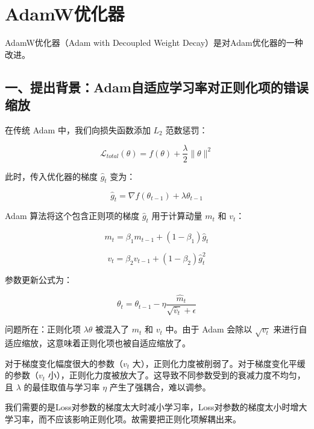 \setcounter{section}{4}

\hypertarget{adamwux4f18ux5316ux5668}{%
\section{AdamW优化器}\label{adamwux4f18ux5316ux5668}}

AdamW优化器（Adam with Decoupled Weight Decay）是对Adam优化器的一种改进。

\hypertarget{ux4e00ux63d0ux51faux80ccux666fadamux81eaux9002ux5e94ux5b66ux4e60ux7387ux5bf9ux6b63ux5219ux5316ux9879ux7684ux9519ux8befux7f29ux653e}{%
\subsection{一、提出背景：Adam自适应学习率对正则化项的错误缩放}\label{ux4e00ux63d0ux51faux80ccux666fadamux81eaux9002ux5e94ux5b66ux4e60ux7387ux5bf9ux6b63ux5219ux5316ux9879ux7684ux9519ux8befux7f29ux653e}}

在传统 Adam 中，我们向损失函数添加 \(L_2\) 范数惩罚：

\[
\mathcal{L}_{total}(\theta) = f(\theta) + \frac{\lambda}{2}\lVert\theta\rVert^2
\]

此时，传入优化器的梯度 \(\hat{g}_t\) 变为：

\[
\hat{g}_t = \nabla f(\theta_{t-1}) + \lambda\theta_{t-1}
\]

Adam 算法将这个包含正则项的梯度 \(\hat{g}_t\) 用于计算动量 \(m_t\) 和 \(v_t\)：

\[
m_t = \beta_1m_{t-1} + (1-\beta_1)\hat{g}_t
\]

\[
v_t = \beta_2v_{t-1} + (1-\beta_2)\hat{g}_t^2
\]

参数更新公式为：

\[
\theta_t = \theta_{t-1} - \eta\frac{\hat{m}_t}{\sqrt{\hat{v}_t}+\epsilon}
\]

问题所在：正则化项 \(\lambda\theta\) 被混入了 \(m_t\) 和 \(v_t\) 中。由于 Adam 会除以 \(\sqrt{v_t}\) 来进行自适应缩放，这意味着正则化项也被自适应缩放了。

对于梯度变化幅度很大的参数（\(v_t\) 大），正则化力度被削弱了。对于梯度变化平缓的参数（\(v_t\) 小），正则化力度被放大了。这导致不同参数受到的衰减力度不均匀，且 \(\lambda\) 的最佳取值与学习率 \(\eta\) 产生了强耦合，难以调参。

我们需要的是Loss对参数的梯度太大时减小学习率，Loss对参数的梯度太小时增大学习率，而不应该影响正则化项。故需要把正则化项解耦出来。

